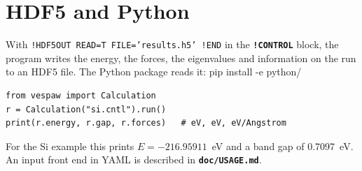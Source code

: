 \documentclass[11pt,a4paper,oneside]{book}
\newcommand{\key}[1]{\textbf{\texttt{#1}}}
\newcommand{\file}[1]{\textbf{\texttt{#1}}}
\newenvironment{shell}{\small\verbatim}{\endverbatim}
\begin{document}
\section{HDF5 and Python}

With \texttt{!HDF5OUT READ=T FILE='results.h5' !END} in the
\key{!CONTROL} block, the program writes the energy, the forces, the
eigenvalues and information on the run to an HDF5 file. The Python
package reads it:
\begin{shell}
pip install -e python/
\end{shell}
\begin{verbatim}
from vespaw import Calculation
r = Calculation("si.cntl").run()
print(r.energy, r.gap, r.forces)   # eV, eV, eV/Angstrom
\end{verbatim}
For the Si example this prints $E=-216.95911$~eV and a band gap of
0.7097~eV. An input front end in YAML is described in
\file{doc/USAGE.md}.
\end{document}
